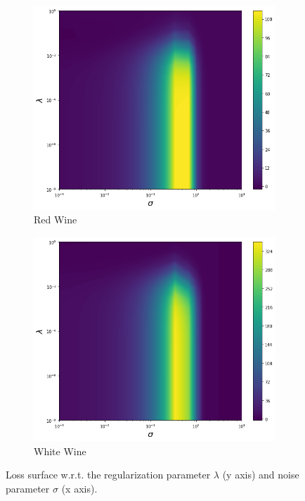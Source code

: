 \begin{figure}[H]
    \begin{subfigure}[b]{0.32\textwidth}
        \includegraphics[width=\textwidth]{figures/score_matching/loss/lossRedWine.png}
        \caption{Red Wine}
    \end{subfigure}
    \begin{subfigure}[b]{0.32\textwidth}
        \includegraphics[width=\textwidth]{figures/score_matching/loss/lossWhiteWine.png}
        \caption{White Wine}
    \end{subfigure}
    \caption{Loss surface w.r.t. the regularization parameter $\lambda$ (y axis) and noise parameter $\sigma$ (x axis).}
    \label{fig:lossdemo_app}
\end{figure}

